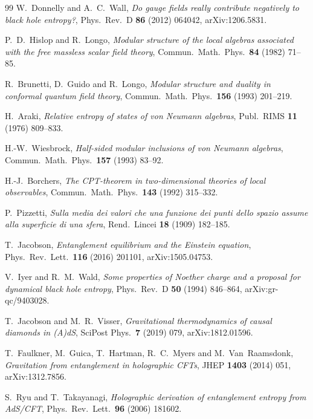 \documentclass[12pt]{article}
\theoremstyle{definition}
\theoremstyle{remark}
\begin{document}
\begin{thebibliography}{99}
W.~Donnelly and A.~C.~Wall, \emph{Do gauge fields really contribute negatively to
black hole entropy?}, Phys.\ Rev.\ D \textbf{86} (2012) 064042, arXiv:1206.5831.

P.~D.~Hislop and R.~Longo, \emph{Modular structure of the local algebras associated with the
free massless scalar field theory}, Commun.\ Math.\ Phys.\ \textbf{84} (1982) 71--85.

R.~Brunetti, D.~Guido and R.~Longo, \emph{Modular structure and duality in conformal quantum
field theory}, Commun.\ Math.\ Phys.\ \textbf{156} (1993) 201--219.

H.~Araki, \emph{Relative entropy of states of von Neumann algebras}, Publ.\ RIMS
\textbf{11} (1976) 809--833.

H.-W.~Wiesbrock, \emph{Half-sided modular inclusions of von Neumann algebras}, Commun.\
Math.\ Phys.\ \textbf{157} (1993) 83--92.

H.-J.~Borchers, \emph{The CPT-theorem in two-dimensional theories of local observables},
Commun.\ Math.\ Phys.\ \textbf{143} (1992) 315--332.

P.~Pizzetti, \emph{Sulla media dei valori che una funzione dei punti dello spazio assume
alla superficie di una sfera}, Rend.\ Lincei \textbf{18} (1909) 182--185.

T.~Jacobson, \emph{Entanglement equilibrium and the Einstein equation}, Phys.\ Rev.\ Lett.\
\textbf{116} (2016) 201101, arXiv:1505.04753.

V.~Iyer and R.~M.~Wald, \emph{Some properties of Noether charge and a proposal for
dynamical black hole entropy}, Phys.\ Rev.\ D \textbf{50} (1994) 846--864,
arXiv:gr-qc/9403028.

T.~Jacobson and M.~R.~Visser, \emph{Gravitational thermodynamics of causal diamonds in
(A)dS}, SciPost Phys.\ \textbf{7} (2019) 079, arXiv:1812.01596.

\bibitem{Faulkner2014}
T.~Faulkner, M.~Guica, T.~Hartman, R.~C.~Myers and M.~Van~Raamsdonk, \emph{Gravitation from
entanglement in holographic CFTs}, JHEP \textbf{1403} (2014) 051, arXiv:1312.7856.

\bibitem{RyuTakayanagi2006}
S.~Ryu and T.~Takayanagi, \emph{Holographic derivation of entanglement entropy from
AdS/CFT}, Phys.\ Rev.\ Lett.\ \textbf{96} (2006) 181602.


\end{thebibliography}
\end{document}
